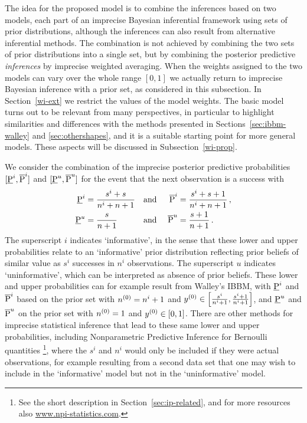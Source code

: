 The idea for the proposed model is to combine the inferences
based on two models, each part of an imprecise
Bayesian inferential framework using sets of prior distributions,
although the inferences can also result from alternative inferential
methods. The combination is not achieved by
combining the two sets of prior distributions into a single set, but
by combining the posterior predictive \emph{inferences}
by imprecise weighted averaging. When the weights assigned to the
two models can vary over the whole range $[0,1]$ we actually return
to imprecise Bayesian inference with a prior set, as considered in this subsection.
In Section~\ref{wi-ext} we
restrict the values of the model weights. The basic model
turns out to be relevant from many perspectives, in
particular to highlight similarities and differences with the
methods presented in Sections~\ref{sec:ibbm-walley} and
\ref{sec:othershapes}, and it is a suitable starting point for more
general models. These aspects will be discussed in
Subsection~\ref{wi-prop}.

We consider the combination of the imprecise posterior
predictive probabilities $[\underline{\operatorname{P}}^i, \overline{\operatorname{P}}^i]$ and $[\underline{\operatorname{P}}^u, \overline{\operatorname{P}}^u]$ for
the event that the next observation is a success with
\begin{align}
\underline{\operatorname{P}}^i &= \frac{s^i+s}{n^i+n+1} & \text{and }& & \overline{\operatorname{P}}^i &= \frac{s^i+s+1}{n^i+n+1}\,,  \label{ilowupp} \\
\underline{\operatorname{P}}^u &= \frac{s}{n+1}         & \text{and }& & \overline{\operatorname{P}}^u &= \frac{s+1}{n+1}        \,.  \label{ulowupp}
\end{align}
The superscript $i$ indicates `informative', in the sense
that these lower and upper probabilities relate to an `informative'
prior distribution reflecting prior
beliefs of similar value as $s^i$ successes in $n^i$ observations.
The superscript $u$ indicates `uninformative', which can be interpreted
as absence of prior beliefs. These
lower and upper probabilities can for example result from
Walley's IBBM, with $\underline{\operatorname{P}}^i$ and $\overline{\operatorname{P}}^i$ based on the prior set with
$n^{(0)} = n^i+1$ and $y^{(0)} \in \left[\frac{s^i}{n^i+1},\frac{s^i+1}{n^i+1}\right]$,
and $\underline{\operatorname{P}}^u$ and $\overline{\operatorname{P}}^u$ on the prior set with $n^{(0)} = 1$ and $y^{(0)} \in [0,1]$.
There are other methods for imprecise statistical inference that
lead to these same lower and upper probabilities, including
Nonparametric Predictive Inference for Bernoulli quantities
\parencite{1998:coolen}%
\footnote{See the short description in Section~\ref{sec:ip-related}, and for more resources also \url{www.npi-statistics.com}.},
where the $s^i$ and $n^i$ would only be included if they were actual
observations, for example resulting from a second data set that one
may wish to include in the `informative' model but not in the `uninformative' model.

